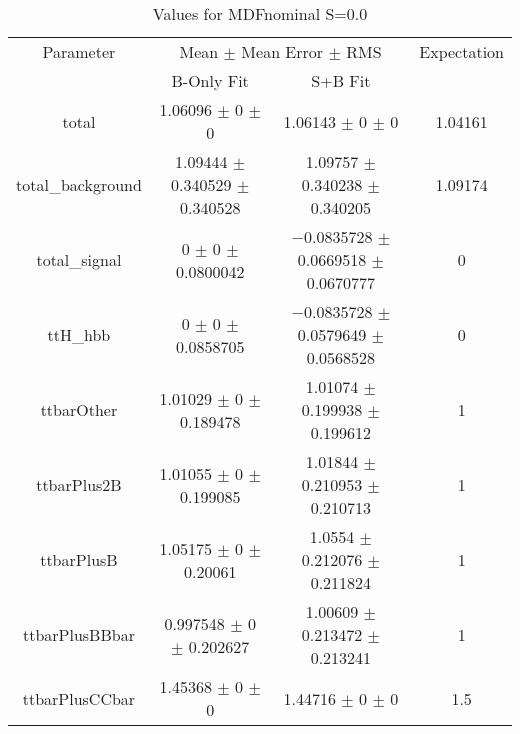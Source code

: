 \begin{table}
\centering
\caption{Values for MDFnominal S=0.0}
\begin{tabular}{cccc}
\toprule
Parameter & \multicolumn{2}{c}{Mean $\pm$ Mean Error $\pm$ RMS} & Expectation\\
 & B-Only Fit & S+B Fit & \\
\midrule
total & \num{1.06096} $\pm$ \num{0} $\pm$ \num{0} & \num{1.06143} $\pm$ \num{0} $\pm$ \num{0} & \num{1.04161}\\
total\_background & \num{1.09444} $\pm$ \num{0.340529} $\pm$ \num{0.340528} & \num{1.09757} $\pm$ \num{0.340238} $\pm$ \num{0.340205} & \num{1.09174}\\
total\_signal & \num{0} $\pm$ \num{0} $\pm$ \num{0.0800042} & \num{-0.0835728} $\pm$ \num{0.0669518} $\pm$ \num{0.0670777} & \num{0}\\
ttH\_hbb & \num{0} $\pm$ \num{0} $\pm$ \num{0.0858705} & \num{-0.0835728} $\pm$ \num{0.0579649} $\pm$ \num{0.0568528} & \num{0}\\
ttbarOther & \num{1.01029} $\pm$ \num{0} $\pm$ \num{0.189478} & \num{1.01074} $\pm$ \num{0.199938} $\pm$ \num{0.199612} & \num{1}\\
ttbarPlus2B & \num{1.01055} $\pm$ \num{0} $\pm$ \num{0.199085} & \num{1.01844} $\pm$ \num{0.210953} $\pm$ \num{0.210713} & \num{1}\\
ttbarPlusB & \num{1.05175} $\pm$ \num{0} $\pm$ \num{0.20061} & \num{1.0554} $\pm$ \num{0.212076} $\pm$ \num{0.211824} & \num{1}\\
ttbarPlusBBbar & \num{0.997548} $\pm$ \num{0} $\pm$ \num{0.202627} & \num{1.00609} $\pm$ \num{0.213472} $\pm$ \num{0.213241} & \num{1}\\
ttbarPlusCCbar & \num{1.45368} $\pm$ \num{0} $\pm$ \num{0} & \num{1.44716} $\pm$ \num{0} $\pm$ \num{0} & \num{1.5}\\
\bottomrule
\end{tabular}
\end{table}